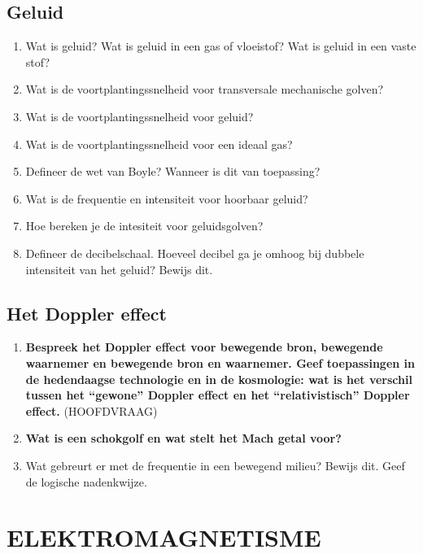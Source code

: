 \documentclass[12pt]{article}
\begin{document}
    \subsection{Geluid}
    \begin{enumerate}
        \item Wat is geluid? Wat is geluid in een gas of vloeistof? Wat is geluid in een vaste stof?
        \item Wat is de voortplantingssnelheid voor transversale mechanische golven?
        \item Wat is de voortplantingssnelheid voor geluid?
        \item Wat is de voortplantingssnelheid voor een ideaal gas?
        \item Defineer de wet van Boyle? Wanneer is dit van toepassing?
        \item Wat is de frequentie en intensiteit voor hoorbaar geluid?
        \item Hoe bereken je de intesiteit voor geluidsgolven?
        \item Defineer de decibelschaal. Hoeveel decibel ga je omhoog bij dubbele intensiteit van het geluid? Bewijs dit.
    \end{enumerate}
    \subsection{Het Doppler effect}
    \begin{enumerate}
        \item \textbf{Bespreek het Doppler effect voor bewegende bron, bewegende waarnemer en bewegende bron en waarnemer. Geef toepassingen in de hedendaagse technologie en in de kosmologie: wat is het verschil tussen het “gewone” Doppler effect en het “relativistisch” Doppler effect.} (HOOFDVRAAG)
        \item \textbf{Wat is een schokgolf en wat stelt het Mach getal voor?}
        \item Wat gebreurt er met de frequentie in een bewegend milieu? Bewijs dit. Geef de logische nadenkwijze.
    \end{enumerate}



    \section{ELEKTROMAGNETISME}
\end{document}
